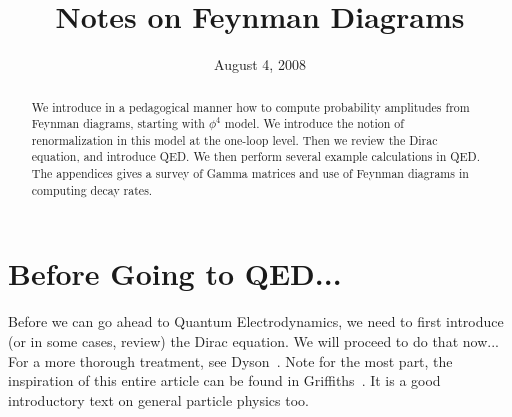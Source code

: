 \documentclass[final,oneside]{article}
\title{Notes on Feynman Diagrams}
\date{August 4, 2008}
\begin{document}
\setlength{\unitlength}{1mm}
\maketitle
\begin{abstract}
We introduce in a pedagogical manner how to compute probability amplitudes
from Feynman diagrams, starting with $\phi^4$ model. We introduce the notion of
renormalization in this model at the one-loop level. Then we review the Dirac
equation, and introduce QED. We then perform several example calculations in
QED. The appendices gives a survey of Gamma matrices and use of Feynman diagrams
in computing decay rates.
\end{abstract}


\section*{Before Going to QED...}

Before we can go ahead to Quantum Electrodynamics, we need to first introduce
(or in some cases, review) the Dirac equation. We will proceed to do that now...
For a more thorough treatment, see Dyson~\cite{Dyson:2006cp}. Note for the most
part, the inspiration of this entire article can be found in Griffiths~\cite{griffiths}.
It is a good introductory text on general particle physics too.


\appendix


\nocite{thaller1992de}\nocite{mandlShaw}\nocite{peskinSchroeder}


\end{document}
